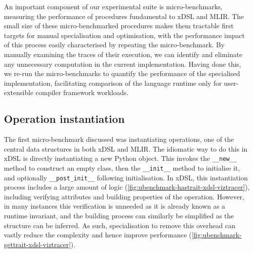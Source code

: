 An important component of our experimental suite is micro-benchmarks, measuring the performance of procedures fundamental to xDSL and MLIR.
The small size of these micro-benchmarked procedures makes them tractable first targets for manual specialisation and optimisation, with the performance impact of this process easily characterised by repeating the micro-benchmark.
By manually examining the traces of their execution, we can identify and eliminate any unnecessary computation in the current implementation.
Having done this, we re-run the micro-benchmarks to quantify the performance of the specialised implementation, facilitating comparison of the language runtime only for user-extensible compiler framework workloads.


\subsection{Operation instantiation}
\label{sec:specialising-ubenchmarks-instantiation}

The first micro-benchmark discussed was instantiating operations, one of the central data structures in both xDSL and MLIR.
The idiomatic way to do this in xDSL is directly instantiating a new Python object.
This invokes the \texttt{__new__} method to construct an empty class, then the \texttt{__init__} method to initialise it, and optionally \texttt{__post_init__} following initialisation.
In xDSL, this instantiation process includes a large amount of logic (\autoref{fig:ubenchmark-hastrait-xdsl-viztracer}), including verifying attributes and building properties of the operation.
However, in many instances this verification is unneeded as it is already known as a runtime invariant, and the building process can similarly be simplified as the structure can be inferred.
As such, specialisation to remove this overhead can vastly reduce the complexity and hence improve performance (\autoref{fig:ubenchmark-gettrait-xdsl-viztracer}).

